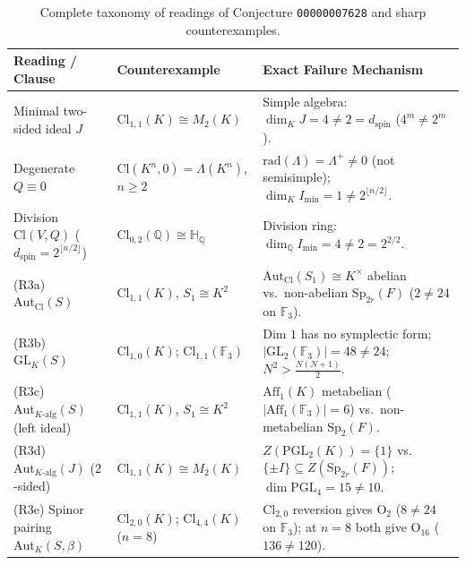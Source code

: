 \documentclass[11pt,a4paper]{article}
\theoremstyle{definition}
\newcommand{\Cl}{\mathrm{Cl}}
\newcommand{\Aut}{\mathrm{Aut}}
\newcommand{\GL}{\mathrm{GL}}
\newcommand{\PGL}{\mathrm{PGL}}
\newcommand{\Sp}{\mathrm{Sp}}
\newcommand{\Orth}{\mathrm{O}}
\newcommand{\Aff}{\mathrm{Aff}}
\newcommand{\rad}{\mathrm{rad}}
\begin{document}
\begin{table}[ht]
\centering
\small
\renewcommand{\arraystretch}{1.2}
\caption{Complete taxonomy of readings of Conjecture \texttt{00000007628} and sharp counterexamples.}
\vspace{4pt}
\label{tab:taxonomy}
\begin{tabular}{@{}p{}p{}p{}@{}}
\hline
\textbf{Reading / Clause} & \textbf{Counterexample} & \textbf{Exact Failure Mechanism} \\
\hline
Minimal two-sided ideal $J$ & $\Cl_{1,1}(K) \cong M_2(K)$ & Simple algebra: $\dim_K J = 4 \neq 2 = d_{\mathrm{spin}}$ ($4^m \neq 2^m$). \\
Degenerate $Q \equiv 0$ & $\Cl(K^n, 0) = \Lambda(K^n)$, $n \ge 2$ & $\rad(\Lambda) = \Lambda^+ \neq 0$ (not semisimple); $\dim_K I_{\min} = 1 \neq 2^{\lfloor n/2 \rfloor}$. \\
Division $\Cl(V, Q)$ ($d_{\mathrm{spin}} = 2^{\lfloor n/2 \rfloor}$) & $\Cl_{0,2}(\mathbb{Q}) \cong \mathbb{H}_{\mathbb{Q}}$ & Division ring: $\dim_{\mathbb{Q}} I_{\min} = 4 \neq 2 = 2^{2/2}$. \\
(R3a) $\Aut_{\Cl}(S)$ & $\Cl_{1,1}(K)$, $S_1 \cong K^2$ & $\Aut_{\Cl}(S_1) \cong K^\times$ abelian vs.\ non-abelian $\Sp_{2r}(F)$ ($2 \neq 24$ on $\mathbb{F}_3$). \\
(R3b) $\GL_K(S)$ & $\Cl_{1,0}(K)$; $\Cl_{1,1}(\mathbb{F}_3)$ & Dim $1$ has no symplectic form; $|\GL_2(\mathbb{F}_3)| = 48 \neq 24$; $N^2 > \frac{N(N+1)}{2}$. \\
(R3c) $\Aut_{K\text{-alg}}(S)$ (left ideal) & $\Cl_{1,1}(K)$, $S_1 \cong K^2$ & $\Aff_1(K)$ metabelian ($|\Aff_1(\mathbb{F}_3)| = 6$) vs.\ non-metabelian $\Sp_2(F)$. \\
(R3d) $\Aut_{K\text{-alg}}(J)$ ($2$-sided) & $\Cl_{1,1}(K) \cong M_2(K)$ & $Z(\PGL_2(K)) = \{1\}$ vs.\ $\{\pm I\} \subseteq Z(\Sp_{2r}(F))$; $\dim \PGL_4 = 15 \neq 10$. \\
(R3e) Spinor pairing $\Aut_K(S, \beta)$ & $\Cl_{2,0}(K)$; $\Cl_{4,4}(K)$ ($n=8$) & $\Cl_{2,0}$ reversion gives $\Orth_2$ ($8 \neq 24$ on $\mathbb{F}_3$); at $n=8$ both give $\Orth_{16}$ ($136 \neq 120$). \\
\hline
\end{tabular}
\end{table}
\end{document}
